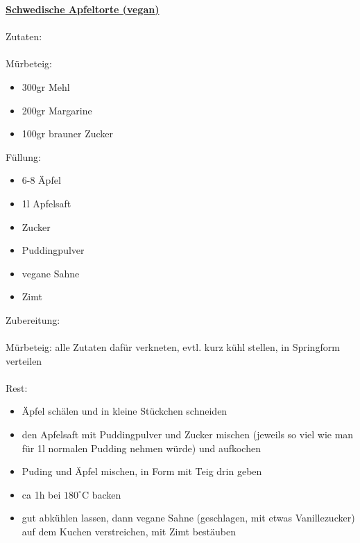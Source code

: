 \documentclass[12pt,a4paper]{article}
\begin{document}
	\textbf{\underline{Schwedische Apfeltorte (vegan)}}\\ \\ 
	Zutaten: \\ \\ 
	Mürbeteig:\begin{itemize}
		\item 300gr Mehl
		\item 200gr Margarine
		\item 100gr brauner Zucker
		\end{itemize}
	Füllung:
	\begin{itemize}
		\item 6-8 Äpfel
		\item 1l Apfelsaft
		\item Zucker
		\item Puddingpulver
		\item vegane Sahne
		\item Zimt
	\end{itemize}
Zubereitung: \\ \\ Mürbeteig: alle Zutaten dafür verkneten, evtl. kurz kühl stellen, in Springform verteilen\\   \\
Rest: \begin{itemize}
	\item Äpfel schälen und in kleine Stückchen schneiden
	\item den Apfelsaft mit Puddingpulver und Zucker mischen (jeweils so viel wie man für 1l normalen Pudding nehmen würde) und aufkochen
	\item Puding und Äpfel mischen, in Form mit Teig drin geben
	\item ca 1h bei $180^\circ$C backen
	\item gut abkühlen lassen, dann vegane Sahne (geschlagen, mit etwas Vanillezucker) auf dem Kuchen verstreichen, mit Zimt bestäuben
\end{itemize}
\end{document}
